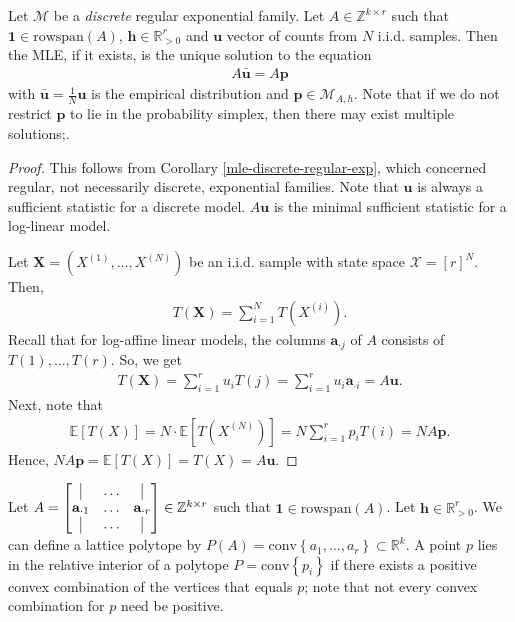\begin{mdframed}  
\begin{thm}
  Let \( \mathcal{M} \)  be a \emph{discrete} regular exponential family.
  Let \( A \in \mathbb{Z}^{k \times r} \) such that \( \mathbf{1} \in \mathrm{rowspan}(A) \), \( \mathbf h \in \mathbb{R}^r_{> 0} \) and \( \mathbf{u} \) vector of counts from \( N \) i.i.d. samples. Then the MLE, if it exists, is the unique solution to the equation 
  \begin{align*}
    A \mathbf{\bar u} = A \mathbf p
  \end{align*}
  with \( \bar{\mathbf u} = \frac{1}{N}\mathbf u \) is the empirical distribution and \( \mathbf p \in \mathcal{M}_{A,h} \). Note that if we do not restrict \( \mathbf p \) to lie in the probability simplex, then there may exist multiple solutions;.
\end{thm}
\end{mdframed}

\begin{proof}
  This follows from Corollary \ref{mle-discrete-regular-exp}, which concerned regular, not necessarily discrete, exponential families. Note that \( \mathbf u \) is always a sufficient statistic for a discrete model. \( A \mathbf u \) is the minimal sufficient statistic for a log-linear model.

  Let \( \mathbf X = (X^{(1)}, \dots, X^{(N)}) \) be an i.i.d. sample with state space \( \mathcal{X} = [r]^{N} \). Then, 
  \begin{align*}
    T(\mathbf X) = \sum_{i=1}^N T(X^{(i)}).
  \end{align*}
  Recall that for log-affine linear models, the columns \( \mathbf a_{\cdot j} \) of \( A \) consists of \( T(1), \dots , T(r) \). So, we get
  \begin{align*}
    T(\mathbf X) =  \sum^r_{i=1} u_i T(j) = \sum^r_{i=1} u_i \mathbf a_{\cdot i} = A \mathbf u.
  \end{align*}
  Next, note that 
  \begin{align*}
    \mathbb{E}[T(X)] = N \cdot \mathbb{E}[T(X^{(N)})] = N \sum^r_{i=1} p_i T(i) = N A \mathbf p.
  \end{align*}
  Hence, \(     N A \mathbf p = \mathbb{E}[T(X)] = T(X) = A \mathbf u
  \).
\end{proof}

Let \( A = \begin{bmatrix}
 \vline & \dots & \vline \\
 \mathbf a_{\cdot 1} & \dots & \mathbf a_{\cdot r} \\
  \vline & \dots & \vline
\end{bmatrix} \in \mathbb{Z}^{k \times r} \) such that \( \mathbf{1} \in \mathrm{rowspan}(A) \). Let \( \mathbf h \in \mathbb{R}^r_{> 0} \). We can define a lattice polytope by \( P(A) = \mathrm{conv}\left\{ a_1, \dots, a_r \right\} \subset \mathbb{R}^k \). A point \( p \) lies in the relative interior of a polytope \( P = \mathrm{conv}\left\{ p_i \right\} \) if there exists a positive convex combination of the vertices that equals \( p \); note that not every convex combination for \( p \) need be positive.

